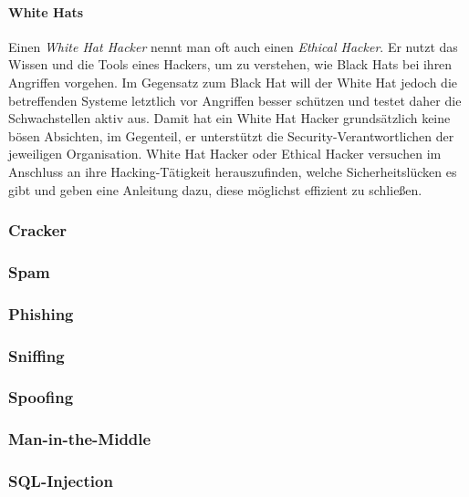 \paragraph{White Hats} Einen \textit{White Hat Hacker} nennt man oft auch einen \textit{Ethical Hacker}. Er nutzt das Wissen und die Tools eines Hackers, um zu verstehen, wie Black Hats bei ihren Angriffen vorgehen. Im Gegensatz zum Black Hat will der White Hat jedoch die betreffenden Systeme letztlich vor Angriffen besser schützen und testet daher die Schwachstellen aktiv aus. Damit hat ein White Hat Hacker grundsätzlich keine bösen Absichten, im Gegenteil, er unterstützt die Security-Verantwortlichen der jeweiligen Organisation. White Hat Hacker oder Ethical Hacker versuchen im Anschluss an ihre Hacking-Tätigkeit herauszufinden, welche Sicherheitslücken es gibt und geben eine Anleitung dazu, diese möglichst effizient zu schließen.

\subsubsection{Cracker}
\label{sec:Cracker}

\subsubsection{Spam}
\label{sec:Spam}

\subsubsection{Phishing}
\label{sec:Phishing}

\subsubsection{Sniffing}
\label{sec:Sniffing}

\subsubsection{Spoofing}
\label{sec:Spoofing}

\subsubsection{Man-in-the-Middle}
\label{sec:ManInTheMiddle}

\subsubsection{SQL-Injection}

